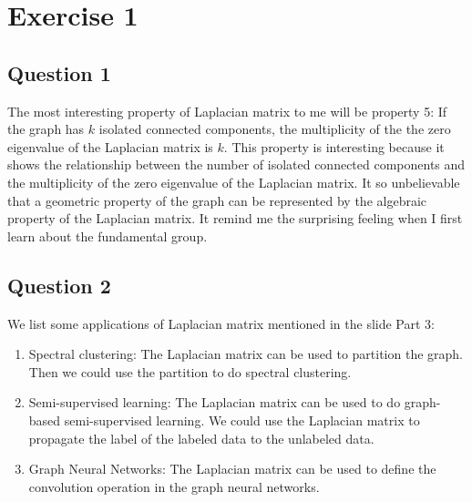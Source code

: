 \section{Exercise 1}

\subsection{Question 1}
The most interesting property of Laplacian matrix to me will be property 5: If the graph has $k$ isolated connected components, the multiplicity of the the zero eigenvalue of the Laplacian matrix is $k$. This property is interesting because it shows the relationship between the number of isolated connected components and the multiplicity of the zero eigenvalue of the Laplacian matrix. It so unbelievable that a geometric property of the graph can be represented by the algebraic property of the Laplacian matrix. It remind me the surprising feeling when I first learn about the fundamental group.

\subsection{Question 2}
We list some applications of Laplacian matrix mentioned in the slide Part 3:
\begin{enumerate}
    \item Spectral clustering: The Laplacian matrix can be used to partition the graph. Then we could use the partition to do spectral clustering.
    \item Semi-supervised learning: The Laplacian matrix can be used to do graph-based semi-supervised learning. We could use the Laplacian matrix to propagate the label of the labeled data to the unlabeled data. 
    \item Graph Neural Networks: The Laplacian matrix can be used to define the convolution operation in the graph neural networks.
\end{enumerate} 
